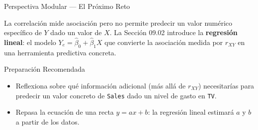 \documentclass[10pt, aspectratio=169]{beamer}
\begin{document}
\begin{frame}{Perspectiva Modular --- El Próximo Reto}
  \scriptsize
  \begin{retoclase}
    La correlación mide asociación pero no permite predecir un valor numérico específico de $Y$ dado un valor de $X$. La Sección 09.02 introduce la \textbf{regresión lineal}: el modelo $Y_e=\hat\beta_0+\hat\beta_1X$ que convierte la asociación medida por $r_{XY}$ en una herramienta predictiva concreta.
  \end{retoclase}

  \vspace{0.08cm}
  \pause
  \begin{alertblock}{Preparación Recomendada}
    \begin{itemize}\itemsep=0.06cm
      \item Reflexiona sobre qué información adicional (más allá de $r_{XY}$) necesitarías para predecir un valor concreto de \texttt{Sales} dado un nivel de gasto en \texttt{TV}.
      \item Repasa la ecuación de una recta $y=ax+b$: la regresión lineal estimará $a$ y $b$ a partir de los datos.
    \end{itemize}
  \end{alertblock}
\end{frame}
\end{document}
